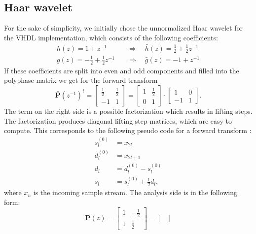 \begin{refsection}
\subsection{Haar wavelet}
\label{fpga:sec:haar}

For the sake of simplicity, we initially chose the unnormalized Haar wavelet for the VHDL implementation, which consists of the following coefficients:
\begin{align}
	h(z) = 1 + z^{-1} \quad & \Rightarrow \quad \bar h(z) = \frac{1}{2} + \frac{1}{2} z^{-1}
	\\
	g(z) = - \frac{1}{2} + \frac{1}{2} z^{-1} \quad & \Rightarrow \quad \bar g(z) = -1 + z^{-1}
\end{align}
If these coefficients are split into even and odd components and filled into the polyphase matrix we get for the forward transform
\begin{equation*}
	\bm {\bar P}(z^{-1})^t =
	\begin{bmatrix}
		\frac{1}{2} & \frac{1}{2} \\
		-1 & 1
	\end{bmatrix}
	= 
	\begin{bmatrix}
		1 & \frac{1}{2} \\
		0 & 1
	\end{bmatrix}
	\cdot
	\begin{bmatrix}
		1 & 0 \\
		-1 & 1
	\end{bmatrix}
	.
\end{equation*}
The term on the right side is a possible factorization which results in lifting steps.
The factorization produces diagonal lifting step matrices, which are easy to compute.
This corresponds to the following pseudo code for a forward transform \cite{fpga:Daubechies1998}:
\begin{align}\label{fpga:equation:haar}
	s_l^{(0)} &= x_{2l} \\
	d_l^{(0)} &= x_{2l+1} \\ 
	d_l &= d_l^{(0)} - s_l^{(0)} \\
	s_l &= s_l^{(0)} + \frac{1}{2}d_l
	,
\end{align}
where $x_{n}$ is the incoming sample stream.
The analysis side is in the following form:
\begin{equation*}
	\bm P(z) =
	\begin{bmatrix}
		1 & -\frac{1}{2} \\
		1 & \frac{1}{2}
	\end{bmatrix}
	= 
	\begin{bmatrix}

\end{bmatrix}
\end{equation*}
\end{refsection}
